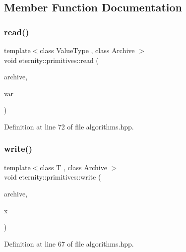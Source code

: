 \subsection{Member Function Documentation}
\mbox{\label{structeternity_1_1primitives_a9770d350c89a97245bf15447586e40cb}} 
\subsubsection{\texorpdfstring{read()}{read()}}
{\footnotesize\ttfamily template$<$class Value\+Type , class Archive $>$ \\
void eternity\+::primitives\+::read (\begin{DoxyParamCaption}\item[{Archive \&}]{archive,  }\item[{Value\+Type $\ast$}]{var }\end{DoxyParamCaption})}



Definition at line 72 of file algorithms.\+hpp.

\mbox{\label{structeternity_1_1primitives_ace523d3626457362731f78d6a8b3d325}} 
\subsubsection{\texorpdfstring{write()}{write()}}
{\footnotesize\ttfamily template$<$class T , class Archive $>$ \\
void eternity\+::primitives\+::write (\begin{DoxyParamCaption}\item[{Archive \&}]{archive,  }\item[{T \&}]{x }\end{DoxyParamCaption})}



Definition at line 67 of file algorithms.\+hpp.

\mbox{\label{structeternity_1_1primitives_af056cf9c18929b6ec47552e9cbb16b77}} 
